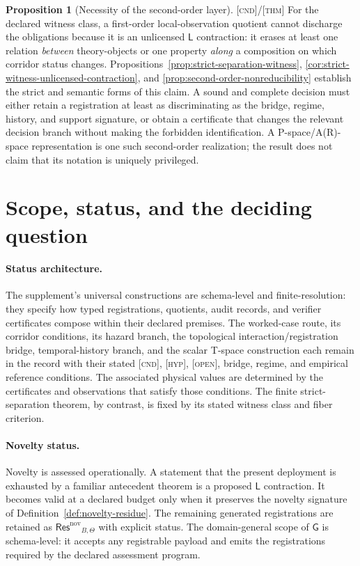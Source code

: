\documentclass[11pt]{article}
\newcommand{\GOp}{\ensuremath{\mathsf{G}}}
\newcommand{\LOp}{\ensuremath{\mathsf{L}}}
\newcommand{\NovRes}{\ensuremath{\mathsf{Res}^{\mathrm{nov}}}}
\newcommand{\Thm}{\textsc{[thm]}}
\newcommand{\Cnd}{\textsc{[cnd]}}
\newcommand{\Hyp}{\textsc{[hyp]}}
\newcommand{\Open}{\textsc{[open]}}
\theoremstyle{definition}
\newtheorem{sproposition}{Proposition}
\begin{document}
\begin{sproposition}[Necessity of the second-order layer]\label{prop:necessity}
\Cnd{}/\Thm{} For the declared witness class, a first-order local-observation
quotient cannot discharge the obligations because it is an unlicensed $\LOp$
contraction: it erases at least one relation \emph{between} theory-objects or one
property \emph{along} a composition on which corridor status changes.
Propositions~\ref{prop:strict-separation-witness},
\ref{cor:strict-witness-unlicensed-contraction}, and
\ref{prop:second-order-nonreducibility} establish the strict and semantic forms
of this claim. A sound and complete decision must either retain a registration at
least as discriminating as the bridge, regime, history, and support signature, or
obtain a certificate that changes the relevant decision branch without making the
forbidden identification. A P-space/A(R)-space representation is one such
second-order realization; the result does not claim that its notation is uniquely
privileged.
\end{sproposition}

\section{Scope, status, and the deciding question}
\label{supp:scope}

\paragraph{Status architecture.} The supplement's universal constructions are
schema-level and finite-resolution: they specify how typed registrations,
quotients, audit records, and verifier certificates compose within their declared
premises. The worked-case route, its corridor conditions, its hazard branch, the
topological interaction/registration bridge, temporal-history branch, and the
scalar T-space construction each remain in the
record with their stated \Cnd{}, \Hyp{}, \Open{}, bridge, regime, and empirical
reference conditions. The associated physical values are determined by the
certificates and observations that satisfy those conditions. The finite
strict-separation theorem, by contrast, is fixed by its stated witness class and
fiber criterion.

\paragraph{Novelty status.} Novelty is assessed operationally. A statement that
the present deployment is exhausted by a familiar antecedent theorem is a proposed
$\LOp$ contraction. It becomes valid at a declared budget only when it preserves
the novelty signature of Definition~\ref{def:novelty-residue}. The remaining
generated registrations are retained as $\NovRes_{B,\Theta}$ with explicit status.
The domain-general scope of $\GOp$ is schema-level: it accepts any registrable
payload and emits the registrations required by the declared assessment program.
\end{document}
